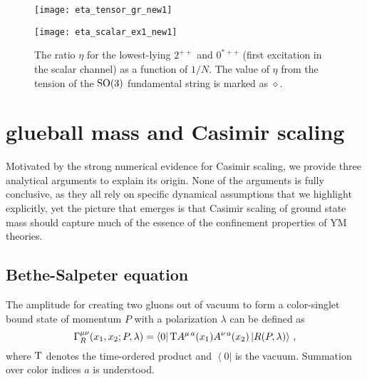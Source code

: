\documentclass[prl,aps,
showpacs,
preprint,
nofootinbib,
floatfix,
superscriptaddress, showkeys
]{revtex4-1}
\begin{document}
\begin{figure}[t]
\hspace{-.2in}
    \centering
    \begin{minipage}{0.48\textwidth}
        \centering
        \texttt{[image: eta\_tensor\_gr\_new1]}
    \end{minipage}%
\hspace{.1in}
    \begin{minipage}{0.48\textwidth}
        \centering
        \texttt{[image: eta\_scalar\_ex1\_new1]}
    \end{minipage}
  \caption{
The  ratio $\eta$ for the lowest-lying $2^{++}$ and $0^{\ast ++}$ (first excitation in the scalar channel) 
 as a function of $1/N$. The value of $\eta$ from  the tension of the ${\rm SO}(3)$ fundamental string is marked as $\diamond$.
}
  \label{fig2}   
\end{figure}



\section{glueball mass and Casimir scaling}
Motivated by the strong numerical evidence for Casimir scaling, 
 we provide three analytical arguments to explain its origin.
None of the arguments is fully conclusive, as they all rely on specific dynamical assumptions that we highlight explicitly,
yet the picture that emerges is that Casimir scaling of ground state mass should capture much of the essence of the 
confinement properties of YM theories.

\subsection{Bethe-Salpeter equation}
The amplitude for creating two gluons out of vacuum to form a color-singlet bound state of momentum $P$ with a polarization $\lambda$
can be defined as 
\begin{equation}
\Gamma_R^{\mu\nu}(x_1,x_2;P,\lambda)=\left<0\right|{\rm T}A^{\mu\,a}(x_1)A^{\nu\,a}(x_2)\left|R(P,\lambda)\right>\,,
\end{equation}
where ${\rm T}$ denotes the time-ordered product and $\left<0\right|$ is the vacuum. Summation over 
color indices $a$ is understood.
\end{document}
